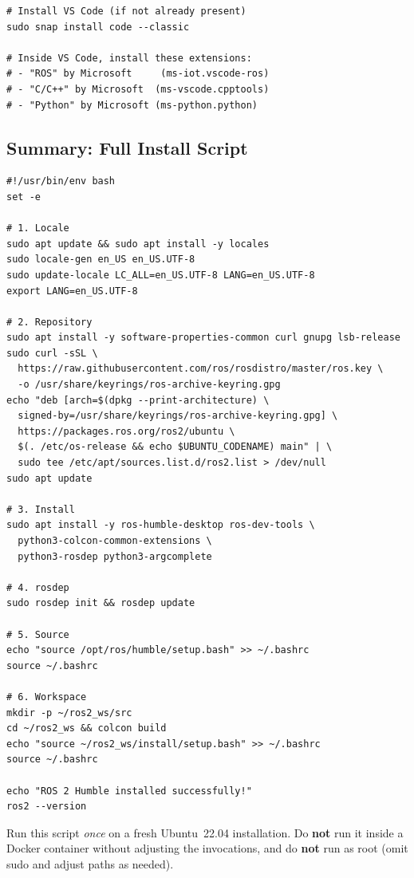 \documentclass[11pt,a4paper]{csarticle}
\begin{document}
\begin{lstlisting}[style=bash]
# Install VS Code (if not already present)
sudo snap install code --classic

# Inside VS Code, install these extensions:
# - "ROS" by Microsoft     (ms-iot.vscode-ros)
# - "C/C++" by Microsoft  (ms-vscode.cpptools)
# - "Python" by Microsoft (ms-python.python)
\end{lstlisting}

\subsection{Summary: Full Install Script}

\begin{lstlisting}[style=bash,caption={One-shot install script for ROS~2 Humble on Ubuntu~22.04}]
#!/usr/bin/env bash
set -e

# 1. Locale
sudo apt update && sudo apt install -y locales
sudo locale-gen en_US en_US.UTF-8
sudo update-locale LC_ALL=en_US.UTF-8 LANG=en_US.UTF-8
export LANG=en_US.UTF-8

# 2. Repository
sudo apt install -y software-properties-common curl gnupg lsb-release
sudo curl -sSL \
  https://raw.githubusercontent.com/ros/rosdistro/master/ros.key \
  -o /usr/share/keyrings/ros-archive-keyring.gpg
echo "deb [arch=$(dpkg --print-architecture) \
  signed-by=/usr/share/keyrings/ros-archive-keyring.gpg] \
  https://packages.ros.org/ros2/ubuntu \
  $(. /etc/os-release && echo $UBUNTU_CODENAME) main" | \
  sudo tee /etc/apt/sources.list.d/ros2.list > /dev/null
sudo apt update

# 3. Install
sudo apt install -y ros-humble-desktop ros-dev-tools \
  python3-colcon-common-extensions \
  python3-rosdep python3-argcomplete

# 4. rosdep
sudo rosdep init && rosdep update

# 5. Source
echo "source /opt/ros/humble/setup.bash" >> ~/.bashrc
source ~/.bashrc

# 6. Workspace
mkdir -p ~/ros2_ws/src
cd ~/ros2_ws && colcon build
echo "source ~/ros2_ws/install/setup.bash" >> ~/.bashrc
source ~/.bashrc

echo "ROS 2 Humble installed successfully!"
ros2 --version
\end{lstlisting}

\begin{notebox}
  Run this script \emph{once} on a fresh Ubuntu~22.04 installation.
  Do \textbf{not} run it inside a Docker container without adjusting the
   invocations, and do \textbf{not} run as root (omit sudo and
  adjust paths as needed).
\end{notebox}
\end{document}
